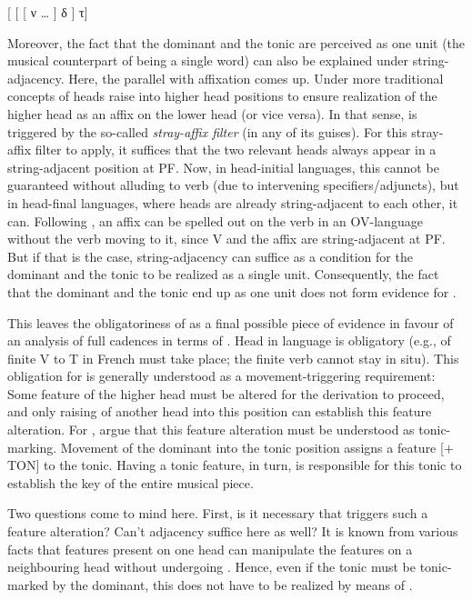 \documentclass[output=paper]{langsci/langscibook}
\begin{document}
\ea\label{bkm:Ref348782802}
    {}[ [ [ ν \dots{} ] δ ] τ]
\z

Moreover, the fact that the dominant and the tonic are perceived as one unit
(the musical counterpart of being a single word) can also be explained under
string-adjacency. Here, the parallel with affixation comes up. Under more
traditional concepts of  heads raise into higher head positions to
ensure realization of the higher head as an affix on the lower head (or vice
versa). In that sense,  is triggered by the so-called
\emph{stray-affix filter} \parencite[cf.][]{Lasnik1981,Lasnik1995b,Baker1988}
(in any of its guises). For this stray-affix filter to apply, it suffices that
the two relevant heads always appear in a string-adjacent position at \gls{PF}.
Now, in head-initial languages, this cannot be guaranteed without alluding to
verb  (due to intervening specifiers/adjuncts), but in head-final
languages, where heads are already string-adjacent to each other, it can.
Following \citet{Bobaljik1995}, an affix can be spelled out on the verb in an
OV-language without the verb moving to it, since V and the affix are
string-adjacent at \gls{PF}.  But if that is the case, string-adjacency can
suffice as a condition for the dominant and the tonic to be realized as a
single unit. Consequently, the fact that the dominant and the tonic end up as
one unit does not form evidence for .

This leaves the obligatoriness of  as a final possible piece of
evidence in favour of an analysis of full cadences in terms of .
Head  in language is obligatory (e.g.,  of finite V to T in
French must take place; the finite verb cannot stay in situ). This obligation
for  is generally understood as a movement-triggering requirement:
Some feature of the higher head must be altered for the derivation to proceed,
and only raising of another head into this position can establish this feature
alteration. For , \citeauthor{KatzPes2011} argue that this feature
alteration must be understood as tonic-marking. Movement of the dominant into
the tonic position assigns a feature [$+$TON] to the tonic. Having a tonic
feature, in turn, is responsible for this tonic to establish the key of the
entire musical piece.

Two questions come to mind here. First, is it necessary that  triggers
such a feature alteration? Can’t adjacency suffice here as well? It is known
from various  facts that features present on one head can
manipulate the features on a neighbouring head without undergoing .
Hence, even if the tonic must be tonic-marked by the dominant, this does not
have to be realized by means of .
\end{document}
